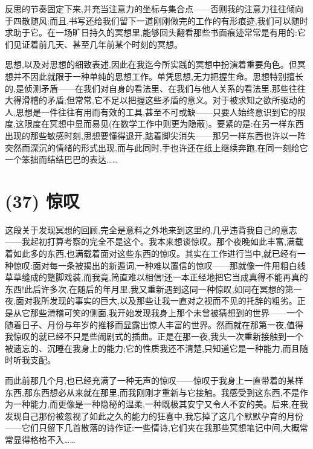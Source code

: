 %
 反思的节奏固定下来,并充当注意力的坐标与集合点——否则我的注意力往往倾向于四散随风;而且,书写还给我们留下一道刚刚做完的工作的有形痕迹,我们可以随时求助于它。在一场旷日持久的冥想里,能够回头翻看那些书面痕迹常常是有用的:它们见证着前几天、甚至几年前某个时刻的冥想。

 思想,以及对思想的细致表述,因此在我迄今所实践的冥想中扮演着重要角色。但冥想并不因此就限于一种单纯的思想工作。单凭思想,无力把握生命。思想特别擅长的,是侦测矛盾——在我们对自身的看法里、在我们与他人关系的看法里,那些往往大得滑稽的矛盾;但常常,它不足以把握这些矛盾的意义。对于被求知之欲所驱动的人,思想是一件往往有用而有效的工具,甚至不可或缺——只要人始终意识到它的限度,这限度在冥想中显而易见(在数学工作中则更为隐蔽)。要紧的是:在另一样东西出现的那些敏感时刻,思想要懂得退开,踮着脚尖消失——那另一样东西也许以一阵突然而深沉的情绪的形式出现,而与此同时,手也许还在纸上继续奔跑,在同一刻给它一个笨拙而结结巴巴的表达……

\section{(37) 惊叹}

这段关于发现冥想的回顾,完全是意料之外地来到这里的,几乎违背我自己的意志——我起初打算考察的完全不是这个。我本来想谈惊叹。那个夜晚如此丰富,满载着如此多的东西,也满载着面对这些东西的惊叹。其实在工作进行当中,就已经有一种惊叹:面对每一条被揭出的新遁词,一种难以置信的惊叹——那就像一件用粗白线草草缝成的蹩脚戏装,而我竟,简直难以相信!还一本正经地把它当成真得不能再真的东西!此后许多次,在随后的年月里,我又重新遇到这同一种惊叹,如同在冥想的第一夜,面对我所发现的事实的巨大,以及那些让我一直对之视而不见的托辞的粗劣。正是从它那些滑稽可笑的侧面,我开始发现我身上那个未曾被猜想到的世界——一个随着日子、月份与年岁的推移而显露出惊人丰富的世界。然而就在那第一夜,值得我惊叹的就已经不只是些闹剧式的插曲。正是在那一夜,我头一次重新接触到一个被遗忘的、沉睡在我身上的能力;它的性质我还不清楚,只知道它是一种能力,而且随时听我支配。

而此前那几个月,也已经充满了一种无声的惊叹——惊叹于我身上一直带着的某样东西,那东西想必从来就在那里,而我刚刚才重新与它接触。我感受到这东西,不是作为一种能力,而更像是一种隐秘的温柔,一种既极其安宁又令人不安的美。后来,在我发现自己那份被忽视了如此之久的能力的狂喜中,我忘掉了这几个默默孕育的月份——它们只留下几首散落的诗作证:一些情诗,它们夹在我那些冥想笔记中间,大概常常显得格格不入……

